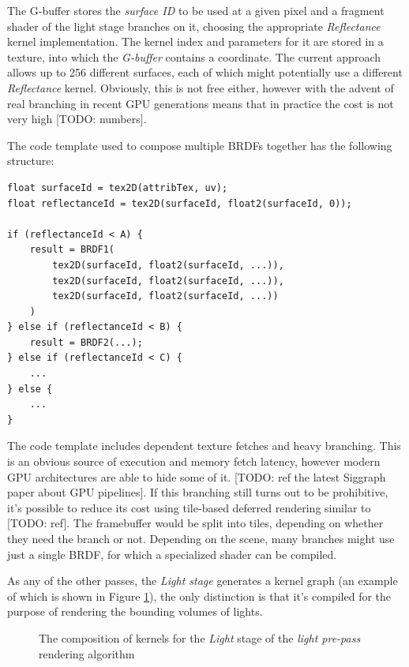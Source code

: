 The G-buffer stores the \emph{surface ID} to be used at a given pixel and a fragment shader of the light stage branches on it, choosing the appropriate \emph{Reflectance} kernel implementation. The kernel index and parameters for it are stored in a texture, into which the \emph{G-buffer} contains a coordinate. The current approach allows up to 256 different surfaces, each of which might potentially use a different \emph{Reflectance} kernel. Obviously, this is not free either, however with the advent of real branching in recent GPU generations means that in practice the cost is not very high [TODO: numbers].

The code template used to compose multiple BRDFs together has the following structure:

\begin{lstlisting}[frame=single]
float surfaceId = tex2D(attribTex, uv);
float reflectanceId = tex2D(surfaceId, float2(surfaceId, 0));
 
if (reflectanceId < A) {
    result = BRDF1(
        tex2D(surfaceId, float2(surfaceId, ...)),
        tex2D(surfaceId, float2(surfaceId, ...)),
        tex2D(surfaceId, float2(surfaceId, ...))
    )
} else if (reflectanceId < B) {
    result = BRDF2(...);
} else if (reflectanceId < C) {
    ...
} else {
    ...
}
\end{lstlisting}

The code template includes dependent texture fetches and heavy branching. This is an obvious source of execution and memory fetch latency, however modern GPU architectures are able to hide some of it. [TODO: ref the latest Siggraph paper about GPU pipelines].
If this branching still turns out to be prohibitive, it's possible to reduce its cost using tile-based deferred rendering similar to [TODO: ref]. The framebuffer would be split into tiles, depending on whether they need the branch or not. Depending on the scene, many branches might use just a single BRDF, for which a specialized shader can be compiled.

As any of the other passes, the \emph{Light stage} generates a kernel graph (an example of which is shown in Figure \ref{fig:DeferredLightingStage2}), the only distinction is that it's compiled for the purpose of rendering the bounding volumes of lights.

\begin{figure}[h!]
  \centering
    \caption[Light Pre-Pass Stage 2]{The composition of kernels for the \emph{Light} stage of the  \emph{light pre-pass} rendering algorithm}
  \label{fig:DeferredLightingStage2}
\end{figure}

